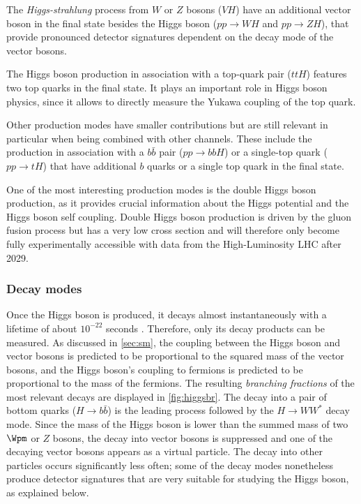 The \emph{Higgs-strahlung} process from $W$ or $Z$ bosons ($VH$) have an additional vector boson in the final state besides the Higgs boson ($pp \rightarrow WH$ and $pp \rightarrow ZH$), that provide pronounced detector signatures dependent on the decay mode of the vector bosons. 

The Higgs boson production in association with a top-quark pair ($ttH$) features two top quarks in the final state. It plays an important role in Higgs boson physics, since it allows to directly measure the Yukawa coupling of the top quark. 

Other production modes have smaller contributions but are still relevant in particular when being combined with other channels.
These include the production in association with a $b\bar{b}$ pair ($pp\rightarrow bbH$) or a single-top quark ($pp \rightarrow tH$) that have additional $b$ quarks or a single top quark in the final state. 

One of the most interesting production modes is the double Higgs boson production, as it provides crucial information about the Higgs potential and the Higgs boson self coupling. Double Higgs boson production is driven by the gluon fusion process but has a very low cross section and will therefore only become fully experimentally accessible with data from the High-Luminosity LHC after 2029. 

\subsubsection{Decay modes}
Once the Higgs boson is produced, it decays almost instantaneously with a lifetime of about $10^{-22}$ seconds \cite{PDG2020}.
Therefore, only its decay products can be measured.
As discussed in \cref{sec:sm}, the coupling between the Higgs boson and vector bosons is predicted to be proportional to the squared mass of the vector bosons, and the Higgs boson's coupling to fermions is predicted to be proportional to the mass of the fermions. The resulting \emph{branching fractions} of the most relevant decays are displayed in \cref{fig:higgsbr}. 
The decay into a pair of bottom quarks ($H\rightarrow b\bar{b}$) is the leading process followed by the $H\rightarrow WW^*$ decay mode. Since the mass of the Higgs boson is lower than the summed mass of two $\Wpm$ or $Z$ bosons, the decay into vector bosons is suppressed and one of the decaying vector bosons appears as a virtual particle. The decay into other particles occurs significantly less often; some of the decay modes nonetheless produce detector signatures that are very suitable for studying the Higgs boson, as explained below.

